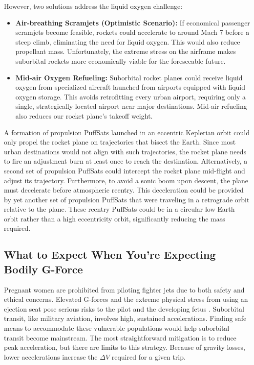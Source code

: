 \documentclass{article}
\begin{document}
{However, two solutions address the liquid oxygen challenge:
\begin{itemize}
\item \textbf{Air-breathing Scramjets (Optimistic Scenario):} If economical passenger scramjets become feasible, rockets could accelerate to around Mach 7 before a steep climb, eliminating the need for liquid oxygen. This would also reduce propellant mass. Unfortunately, the extreme stress on the airframe makes suborbital rockets more economically viable for the foreseeable future.
\item \textbf{Mid-air Oxygen Refueling:} Suborbital rocket planes could receive liquid oxygen from specialized aircraft launched from airports equipped with liquid oxygen storage. This avoids retrofitting every urban airport, requiring only a single, strategically located airport near major destinations.   Mid-air refueling also reduces our rocket plane's takeoff weight.
\end{itemize}

A formation of propulsion PuffSats launched in an eccentric Keplerian orbit could only propel the  rocket plane on trajectories that bisect the Earth. Since most urban destinations would not align with such trajectories, the rocket plane needs to fire an adjustment burn at least once to reach the destination. Alternatively, a second set of propulsion PuffSats could intercept the rocket plane mid-flight and adjust its trajectory. Furthermore, to avoid a sonic boom upon descent, the plane must decelerate before atmospheric reentry. This deceleration could be provided by yet another set of propulsion PuffSats that were traveling in a retrograde orbit relative to the plane. These reentry PuffSats could be in a circular low Earth orbit rather than a high eccentricity orbit, significantly reducing the mass required.

\subsection{What to Expect When You're Expecting Bodily G-Force \cite{expecting_pregnancy_book}} \label{sec:pregnant_women}

Pregnant women are prohibited from piloting fighter jets due to both safety and ethical concerns. Elevated G-forces and the extreme physical stress from using an ejection seat pose serious risks to the pilot and the developing fetus \cite{pregnancy_gforce_risk}. Suborbital transit, like military aviation, involves high, sustained accelerations.  Finding safe means to accommodate these vulnerable populations would help suborbital transit become mainstream.  The most straightforward mitigation is to reduce peak acceleration, but there are limits to this strategy.  Because of gravity losses, lower accelerations increase the $\Delta V$ required for a given trip.  

}
\end{document}
